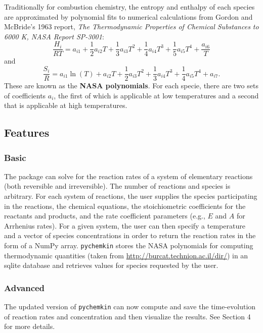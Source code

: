 \documentclass[12pt]{article}
\begin{document}
Traditionally for combustion chemistry, the entropy and enthalpy of each species are approximated by polynomial fits to numerical calculations from Gordon and McBride's 1963 report, \textit{The Thermodynamic Properties of Chemical Substances to 6000 K, NASA Report SP-3001}:
\begin{equation}
\frac{H_{i}}{RT} = a_{i1} + \frac{1}{2}a_{i2}T + \frac{1}{3}a_{i3}T^{2} + \frac{1}{4}a_{i4}T^{3} + \frac{1}{5}a_{i5}T^{4} + \frac{a_{i6}}{T}
\end{equation}
and 
\begin{equation}
\frac{S_{i}}{R} = a_{i1}\ln\left(T\right) + a_{i2}T + \frac{1}{2}a_{i3}T^{2} + \frac{1}{3}a_{i4}T^{3} + \frac{1}{4}a_{i5}T^{4} + a_{i7}.
\end{equation}
These are known as the \textbf{NASA polynomials}. For each specie, there are two sets of coefficients $a_i$, the first of which is applicable at low temperatures and a second that is applicable at high temperatures. 

\subsection{Features}
\subsubsection{Basic}
The package can solve for the reaction rates of a system of elementary reactions (both reversible and irreversible). The number of reactions and species is arbitrary. For each system of reactions, the user supplies the species participating in the reactions, the chemical equations, the stoichiometric coefficients for the reactants and products, and the rate coefficient parameters (e.g., $E$ and $A$ for Arrhenius rates). For a given system, the user can then specify a temperature and a vector of species concentrations in order to return the reaction rates in the form of a NumPy array. \texttt{pychemkin} stores the NASA polynomials for computing thermodynamic quantities (taken from \url{http://burcat.technion.ac.il/dir/}) in an sqlite database and retrieves values for species requested by the user. 
\subsubsection{Advanced}
The updated version of \texttt{pychemkin} can now compute and save the time-evolution of reaction rates and concentration and then visualize the results. See Section 4 for more details. 
\end{document}
